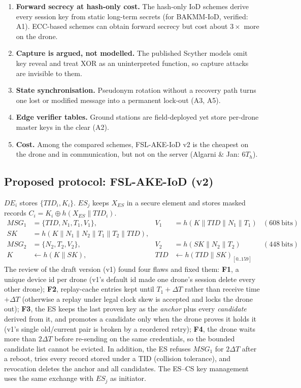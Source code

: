\begin{enumerate}
\item \textbf{Forward secrecy at hash-only cost.} The hash-only IoD schemes derive every session key from static long-term
secrets (for BAKMM-IoD, verified: A1). ECC-based schemes can obtain forward secrecy but cost about $3\times$ more on the drone.
\item \textbf{Capture is argued, not modelled.} The published Scyther models omit key reveal and treat XOR as an uninterpreted function,
so capture attacks are invisible to them.
\item \textbf{State synchronisation.} Pseudonym rotation without a recovery path turns one lost or modified message into a permanent
lock-out (A3, A5).
\item \textbf{Edge verifier tables.} Ground stations are field-deployed yet store per-drone master keys in the clear (A2).
\item \textbf{Cost.} Among the compared schemes, FSL-AKE-IoD v2 is the cheapest on the drone and in communication,
but not on the server (Algarni \& Jan: $6T_h$).
\end{enumerate}

\subsection{Proposed protocol: FSL-AKE-IoD (v2)}
\label{subsec:w3-protocol}

$DE_i$ stores $\{TID_i,K_i\}$. $ES_j$ keeps $X_{ES}$ in a secure element and stores masked records
$C_i=K_i\oplus h(X_{ES}\|TID_i)$.
\begin{align}
MSG_1 &= \{TID,N_1,T_1,V_1\}, & V_1 &= h(K\|TID\|N_1\|T_1) & (608~\text{bits})\\
SK &= h(K\|N_1\|N_2\|T_1\|T_2\|TID), & & & \\
MSG_2 &= \{N_2,T_2,V_2\}, & V_2 &= h(SK\|N_2\|T_2) & (448~\text{bits})\\
K &\leftarrow h(K\|SK), & TID &\leftarrow h(TID\|SK)_{[0..159]} &
\end{align}
The review of the draft version (v1) found four flaws and fixed them:
\textbf{F1}, a unique device id per drone (v1's default id made one drone's session delete every other drone);
\textbf{F2}, replay-cache entries kept until $T_1+\Delta T$ rather than receive time $+\Delta T$ (otherwise a replay
under legal clock skew is accepted and locks the drone out);
\textbf{F3}, the ES keeps the last proven key as the \emph{anchor} plus every \emph{candidate} derived from it, and
promotes a candidate only when the drone proves it holds it (v1's single old/current pair is broken by a reordered
retry);
\textbf{F4}, the drone waits more than $2\Delta T$ before re-sending on the same credentials, so the bounded candidate
list cannot be evicted.
In addition, the ES refuses $MSG_1$ for $2\Delta T$ after a reboot, tries every record stored under a TID
(collision tolerance), and revocation deletes the anchor and all candidates. The ES--CS key management uses the same
exchange with $ES_j$ as initiator.

